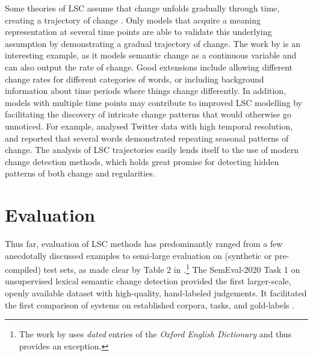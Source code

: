 \documentclass[output=paper]{langscibook}
\begin{document}
Some theories of LSC assume that change unfolds gradually through time, creating a trajectory of change  \citep[e.g., the regular patterns of semantic change in][]{traugott2001regularity}. Only models that acquire a meaning representation at several time points \citep[e.g.][]{tsakalidis-liakata-2020-sequential} are able to validate this underlying assumption by demonstrating a gradual trajectory of change. The work by \citet{rosenfeld-erk-2018-deep} is an interesting example, as it models semantic change as a continuous variable and can also output the rate of change. Good extensions include allowing different change rates for different categories of words, or including background information about time periods where things change differently.  
In addition, models with multiple time points may contribute to improved LSC modelling by facilitating the discovery of intricate change patterns that would otherwise go unnoticed. 
For example, \citet{shoemark-etal-2019-room} analysed Twitter data with high temporal resolution, and reported that several words demonstrated repeating seasonal patterns of change. The analysis of LSC trajectories easily lends itself to the use of modern change detection methods, which holds great promise for detecting hidden patterns of both change and regularities.

\section{Evaluation}
\label{s:evaluation}
Thus far, evaluation of LSC methods has predominantly ranged from a few anecdotally discussed examples to semi-large evaluation on (synthetic or pre-com\-piled) test sets, as made clear by Table 2 in \citet{tahmasebi2018survey}.\footnote{The work by \citet{hu-etal-2019-diachronic} uses \textit{dated} entries of the \textit{Oxford English Dictionary} and thus provides an exception.} The SemEval-2020 Task 1 on unsupervised lexical semantic change detec\-tion provided the first larger-scale, openly available dataset with high-quality, hand-label\-ed judgements. It facilitated the first comparison of systems on established corpora, tasks, and gold-labels \citep{schlechtweg-etal-2020-semeval}. 
\end{document}

